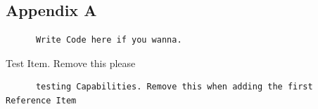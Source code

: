 \documentclass[a4paper, 11pt]{article}
\begin{document}
\begin{enumerate}
\newpage

\section{Appendix A}
  
  \begin{verbatim}
      Write Code here if you wanna.
  \end{verbatim}

\newpage

\begin{thebibliography}{9}
   Test Item. Remove this please 
  \begin{verbatim}
      testing Capabilities. Remove this when adding the first Reference Item
  \end{verbatim}

\end{thebibliography}


\end{enumerate}
\end{document}
